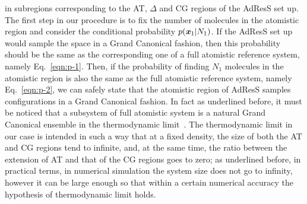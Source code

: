 \documentclass[aip,jcp,a4paper,reprint,onecolumn]{revtex4-1}
\newcommand{\vect}[1]{\textbf{\textit{#1}}}
\newcommand{\HY}{{\Delta}}
\begin{document}
in subregions corresponding to the AT, $\HY$ and CG regions of the AdResS
set up. The first step in our procedure is to fix the number of molecules in the atomistic
region and consider the conditional probability $p(\vect x_1 |
N_1)$. If the AdResS set up would sample the space in a Grand Canonical fashion, then this
probability should be the same as the corresponding one of a full
atomistic reference system, namely Eq.~\eqref{eqn:p-1}.  Then, if the
probability of finding $N_1$ molecules in the atomistic region is also
the same as the full atomistic reference system, namely
Eq.~\eqref{eqn:p-2}, we can safely state that the atomistic region of AdResS
samples configurations in a Grand Canonical fashion. In fact as underlined before, it must be noticed that a subsystem of full atomistic system is a natural Grand Canonical ensemble in the thermodynamic limit~\cite{lanford1973entropy}. 
The thermodynamic limit in our case is intended in such a way that at a fixed density, the size of
  both the AT and CG regions tend to infinite, and, at the same time,
  the ratio between the extension of AT and that of the CG regions goes to zero; as underlined before, in practical terms, in numerical simulation the system size does not go to infinity, however it can be large enough so that within a certain numerical accuracy the hypothesis of thermodynamic limit holds.
\end{document}
